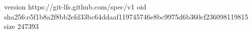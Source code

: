 version https://git-lfs.github.com/spec/v1
oid sha256:e5f1b8a2f8bb2efd33bc64ddaaf119745746e8bc9975d6b360cf236098119815
size 247393
